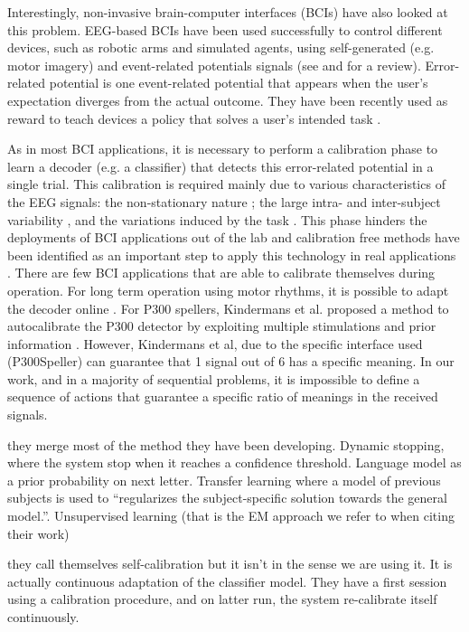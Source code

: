Interestingly, non-invasive brain-computer interfaces (BCIs) have also looked at this problem. EEG-based BCIs have been used successfully to control different devices, such as robotic arms and simulated agents, using self-generated (e.g. motor imagery) and event-related potentials signals (see \cite{chavarriaga2014errare} and \cite{millan10} for a review). 
%
Error-related potential is one event-related potential that appears when the user's expectation diverges from the actual outcome. They have been recently used as reward to teach devices a policy that solves a user's intended task \cite{chavarriaga2010learning,iturrate2010robot}.

As in most BCI applications, it is necessary to perform a calibration phase to learn a decoder (e.g. a classifier) that detects this error-related potential in a single trial. This calibration is required mainly due to various characteristics of the EEG signals: the non-stationary nature \cite{vidaurre11}; the large intra- and inter-subject variability \cite{Polich1997}, and the variations induced by the task \cite{iturrate2013task}. This phase hinders the deployments of BCI applications out of the lab and calibration free methods have been identified as an important step to apply this technology in real applications \cite{millan10}. 
There are few BCI applications that are able to calibrate themselves during operation.  For long term operation using motor rhythms, it is possible to adapt the decoder online \cite{vidaurre2010towards}. For P300 spellers, Kindermans et al. proposed a method to autocalibrate the P300 detector by exploiting multiple stimulations and prior information \cite{Kindermans2012a,Kindermans2012b}. However, Kindermans et al, due to the specific interface used (P300Speller) can guarantee that 1 signal out of 6 has a specific meaning. In our work, and in a majority of sequential problems, it is impossible to define a sequence of actions that guarantee a specific ratio of meanings in the received signals.

\cite{kindermans2014integrating} they merge most of the method they have been developing. Dynamic stopping, where the system stop when it reaches a confidence threshold. Language model as a prior probability on next letter. Transfer learning where a model of previous subjects is used to ``regularizes the subject-specific solution towards the general model.''. Unsupervised learning (that is the EM approach we refer to when citing their work)

\cite{schettini2014self} they call themselves self-calibration but it isn't in the sense we are using it. It is actually continuous adaptation of the classifier model. They have a first session using a calibration procedure, and on latter run, the system re-calibrate itself continuously.

